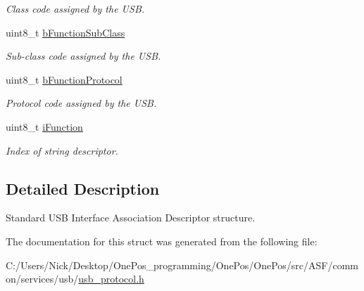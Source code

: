 \begin{DoxyCompactItemize}
\begin{DoxyCompactList}\small\item\em Class code assigned by the U\-S\-B. \end{DoxyCompactList}\item 
\hypertarget{structusb__association__desc__t_a4ab4cadd0f156f30edea9d4724501a06}{uint8\-\_\-t \hyperlink{structusb__association__desc__t_a4ab4cadd0f156f30edea9d4724501a06}{b\-Function\-Sub\-Class}}\label{structusb__association__desc__t_a4ab4cadd0f156f30edea9d4724501a06}

\begin{DoxyCompactList}\small\item\em Sub-\/class code assigned by the U\-S\-B. \end{DoxyCompactList}\item 
\hypertarget{structusb__association__desc__t_a7e136eb3457b18de956967735b236783}{uint8\-\_\-t \hyperlink{structusb__association__desc__t_a7e136eb3457b18de956967735b236783}{b\-Function\-Protocol}}\label{structusb__association__desc__t_a7e136eb3457b18de956967735b236783}

\begin{DoxyCompactList}\small\item\em Protocol code assigned by the U\-S\-B. \end{DoxyCompactList}\item 
\hypertarget{structusb__association__desc__t_aeedbc36cd31e652127b78004b0c66031}{uint8\-\_\-t \hyperlink{structusb__association__desc__t_aeedbc36cd31e652127b78004b0c66031}{i\-Function}}\label{structusb__association__desc__t_aeedbc36cd31e652127b78004b0c66031}

\begin{DoxyCompactList}\small\item\em Index of string descriptor. \end{DoxyCompactList}\end{DoxyCompactItemize}


\subsection{Detailed Description}
Standard U\-S\-B Interface Association Descriptor structure. 

The documentation for this struct was generated from the following file\-:\begin{DoxyCompactItemize}
\item 
C\-:/\-Users/\-Nick/\-Desktop/\-One\-Pos\-\_\-programming/\-One\-Pos/\-One\-Pos/src/\-A\-S\-F/common/services/usb/\hyperlink{usb__protocol_8h}{usb\-\_\-protocol.\-h}\end{DoxyCompactItemize}
